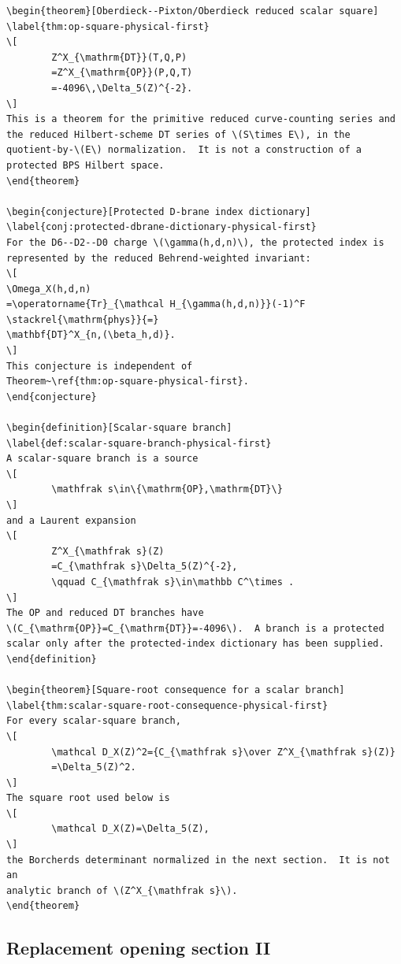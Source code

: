 \begin{verbatim}
\begin{theorem}[Oberdieck--Pixton/Oberdieck reduced scalar square]
\label{thm:op-square-physical-first}
\[
        Z^X_{\mathrm{DT}}(T,Q,P)
        =Z^X_{\mathrm{OP}}(P,Q,T)
        =-4096\,\Delta_5(Z)^{-2}.
\]
This is a theorem for the primitive reduced curve-counting series and
the reduced Hilbert-scheme DT series of \(S\times E\), in the
quotient-by-\(E\) normalization.  It is not a construction of a
protected BPS Hilbert space.
\end{theorem}

\begin{conjecture}[Protected D-brane index dictionary]
\label{conj:protected-dbrane-dictionary-physical-first}
For the D6--D2--D0 charge \(\gamma(h,d,n)\), the protected index is
represented by the reduced Behrend-weighted invariant:
\[
\Omega_X(h,d,n)
=\operatorname{Tr}_{\mathcal H_{\gamma(h,d,n)}}(-1)^F
\stackrel{\mathrm{phys}}{=}
\mathbf{DT}^X_{n,(\beta_h,d)}.
\]
This conjecture is independent of
Theorem~\ref{thm:op-square-physical-first}.
\end{conjecture}

\begin{definition}[Scalar-square branch]
\label{def:scalar-square-branch-physical-first}
A scalar-square branch is a source
\[
        \mathfrak s\in\{\mathrm{OP},\mathrm{DT}\}
\]
and a Laurent expansion
\[
        Z^X_{\mathfrak s}(Z)
        =C_{\mathfrak s}\Delta_5(Z)^{-2},
        \qquad C_{\mathfrak s}\in\mathbb C^\times .
\]
The OP and reduced DT branches have
\(C_{\mathrm{OP}}=C_{\mathrm{DT}}=-4096\).  A branch is a protected
scalar only after the protected-index dictionary has been supplied.
\end{definition}

\begin{theorem}[Square-root consequence for a scalar branch]
\label{thm:scalar-square-root-consequence-physical-first}
For every scalar-square branch,
\[
        \mathcal D_X(Z)^2={C_{\mathfrak s}\over Z^X_{\mathfrak s}(Z)}
        =\Delta_5(Z)^2.
\]
The square root used below is
\[
        \mathcal D_X(Z)=\Delta_5(Z),
\]
the Borcherds determinant normalized in the next section.  It is not an
analytic branch of \(Z^X_{\mathfrak s}\).
\end{theorem}
\end{verbatim}

\subsection{Replacement opening section II}

